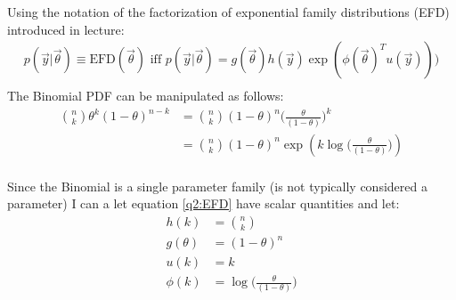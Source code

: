 
Using the notation of the factorization of exponential family distributions (EFD) introduced in lecture:
\begin{align}
    \label{q2:EFD}
    p(\vec{y}|\vec{\theta}) \equiv \text{EFD}(\vec{\theta}) \text{ iff } p(\vec{y}|\vec{\theta}) = g(\vec{\theta})h(\vec{y})\exp(\phi(\vec{\theta})^T u(\vec{y})))\\
\end{align}
The Binomial PDF can be manipulated as follows:
\begin{align*}
    {n \choose k}\theta^k(1-\theta)^{n-k} &= {n \choose k}(1-\theta)^{n}\Big(\frac{\theta}{(1-\theta)}\Big)^k\\
    &= {n \choose k}(1-\theta)^{n}\exp(k\log\Big(\frac{\theta}{(1-\theta)}\Big))\\
\end{align*}

Since the Binomial is a single parameter family (is not typically considered a parameter) I can a let equation \ref{q2:EFD} have scalar quantities and let:
\begin{align*}
    h(k) &= {n \choose k}\\
    g(\theta) &= (1-\theta)^{n}\\
    u(k) &= k\\
    \phi(k) &= \log\Big(\frac{\theta}{(1-\theta)}\Big)\\
\end{align*}


